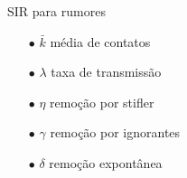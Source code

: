 \documentclass{beamer}
\theoremstyle{plain}
\theoremstyle{definition}
\begin{document}
\begin{frame}{SIR para rumores}
\begin{minipage}{0.4\textwidth}
    \end{minipage}%
    \hfill%
    \begin{minipage}{0.5\textwidth}
        \vspace{-0.3cm}

        \begin{itemize}
            \item[$\bullet$] $\bar{k}$ média de contatos 
            \item[$\bullet$] $\lambda$ taxa de transmissão
            \item[$\bullet$] $\eta$ remoção por stifler 
            \item[$\bullet$] $\gamma$ remoção por ignorantes 
            \item[$\bullet$] $\delta$ remoção expontânea 
        \end{itemize}

    \end{minipage}

    
     
\end{frame}

\end{document}
